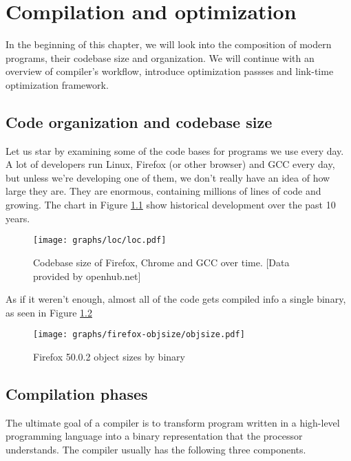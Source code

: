 %
\newcommand{\definice}{\paragraph{Definice.}}

\chapter{Compilation and optimization}

In the beginning of this chapter, we will look into the composition of modern
programs, their codebase size and organization. We will continue with an
overview of compiler's workflow, introduce optimization passses and link-time
optimization framework.

\section{Code organization and codebase size}

Let us star by examining some of the code bases for programs we use every day.
A lot of developers run Linux, Firefox (or other browser) and GCC every day, but
unless we're developing one of them, we don't really have an idea of how large
they are. They are enormous, containing millions of lines of code and growing. 
The chart in Figure \ref{figure-loc} show historical development over the past 10
years.

\begin{figure}[h!]
\label{figure-loc}
\centering
\texttt{[image: graphs/loc/loc.pdf]}
\caption{Codebase size of Firefox, Chrome and GCC over time. [Data provided by
	openhub.net]}
\end{figure}

As if it weren't enough, almost all of the code gets compiled info a single
binary, as seen in Figure \ref{figure-firefox-objsize}

\begin{figure}[h!]
\label{figure-firefox-objsize}
\centering
\texttt{[image: graphs/firefox-objsize/objsize.pdf]}
\caption{Firefox 50.0.2 object sizes by binary}
\end{figure}


\section{Compilation phases}

The ultimate goal of a compiler is to transform program written in a high-level
programming language into a binary representation that the processor
understands. The compiler usually has the following three components.

